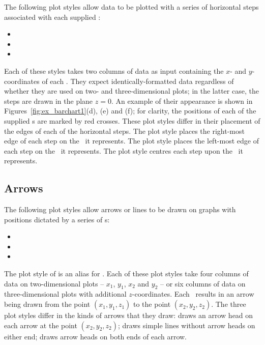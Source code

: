 The following plot styles allow data to be plotted with a series of horizontal
steps associated with each supplied \datapoint:
\begin{itemize}
\item {}
\item {}
\item {}
\end{itemize}
Each of these styles takes two columns of data as input containing the $x$- and
$y$-coordinates of each \datapoint.  They expect identically-formatted data
regardless of whether they are used on two- and three-dimensional plots; in the
latter case, the steps are drawn in the plane $z=0$.  An example of their
appearance  is shown in Figures~\ref{fig:ex_barchart1}(d), (e) and (f); for
clarity, the positions of each of the supplied \datapoint s are marked by red
crosses.  These plot styles differ in their placement of the edges of each of
the horizontal steps.  The  plot style places the right-most edge
of each step on the \datapoint\ it represents.  The  plot style
places the left-most edge of each step on the \datapoint\ it represents.  The
 plot style centres each step upon the \datapoint\ it
represents.

\subsection{Arrows}

The following plot styles allow arrows or lines to be drawn on graphs with
positions dictated by a series of \datapoint s:
\begin{itemize}
\item {}
\item {}
\item {}
\end{itemize}
The plot style of  is an alias for .  Each
of these plot styles take four columns of data on two-dimensional plots --
$x_1$, $y_1$, $x_2$ and $y_2$ -- or six columns of data on three-dimensional
plots with additional $z$-coordinates. Each \datapoint\ results in an arrow
being drawn from the point $(x_1,y_1,z_1)$ to the point $(x_2,y_2,z_2)$. The
three plot styles differ in the kinds of arrows that they draw:
 draws an arrow head on each arrow at the point
$(x_2,y_2,z_2)$;  draws simple lines without arrow heads
on either end;  draws arrow heads on both ends of each
arrow.

